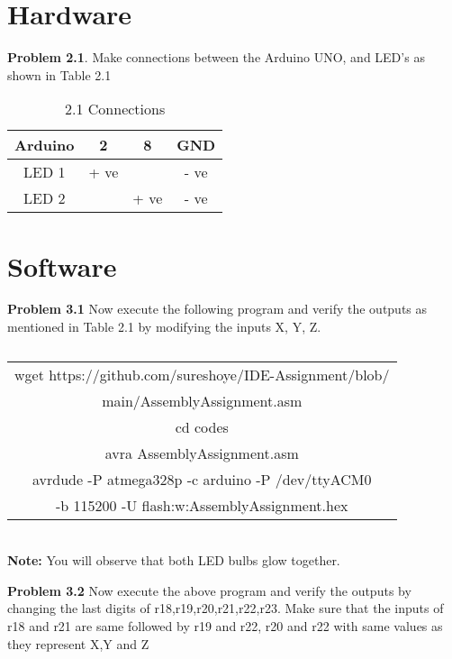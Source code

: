 \documentclass[journal,12pt,twocolumn]{IEEEtran}
\begin{document}
\section{Hardware}


\textbf{Problem 2.1}. Make connections between the Arduino UNO, and LED's as shown in Table 2.1 \\


\begin{table}[h]
    \centering
    \begin{tabular}{| c | c | c | c |}
        \hline
         Arduino & 2 & 8 & GND  \\
       \hline
       LED 1 & + ve &  & - ve  \\
        \hline
      LED 2 &  & + ve & - ve  \\
        \hline
         
         \hline
    \end{tabular}
    \caption{2.1 Connections}
\end{table}

\section{Software}

\textbf{Problem 3.1} Now execute the following program and verify the outputs as mentioned in Table 2.1 by modifying the inputs X, Y, Z.\\
\begin{table}[h]
    \centering
    \begin{tabular}{| c |}
    \hline
    wget https://github.com/sureshoye/IDE-Assignment/blob/\\main/AssemblyAssignment.asm\\
    cd codes \\

	avra AssemblyAssignment.asm \\

	avrdude -P atmega328p -c arduino -P /dev/ttyACM0 \\-b 115200 -U flash:w:AssemblyAssignment.hex\\
    
    \hline
    \end{tabular}
    \caption{}
    \label{}
 \end{table}
 \\
\textbf{Note:} You will observe that both LED bulbs glow together.

\textbf{Problem 3.2} Now execute the above program and verify the outputs by changing the last digits of r18,r19,r20,r21,r22,r23. Make sure that the inputs of r18 and r21 are same followed by r19 and r22, r20 and r22 with same values as they represent X,Y and Z \\
\end{document}
